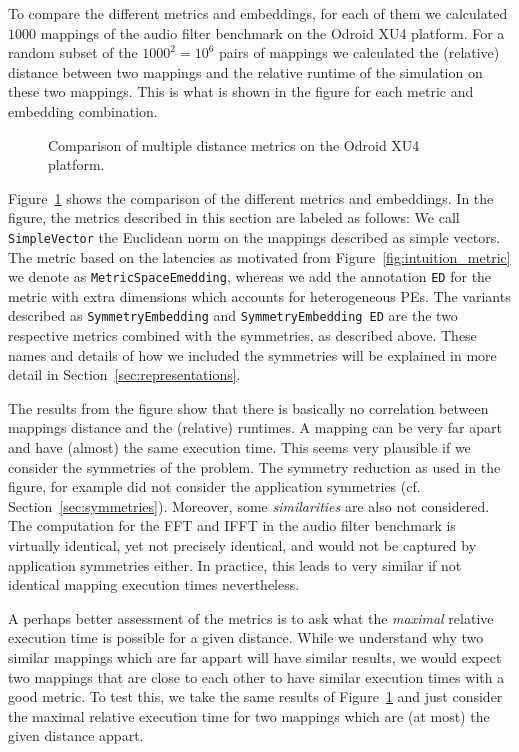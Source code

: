 To compare the different metrics and embeddings, for each of them we calculated $1000$ mappings of the audio filter benchmark on the Odroid XU4 platform. 
For a random subset of the $1000^2 = 10^6$ pairs of mappings we calculated the (relative) distance between two mappings and the relative runtime of the simulation on these two mappings.
This is what is shown in the figure for each metric and embedding combination. 

\begin{figure}[h]
	\centering
	\caption{Comparison of multiple distance metrics on the Odroid XU4 platform.}
	\label{fig:metric_comparison_exynos}
\end{figure}

Figure~\ref{fig:metric_comparison_exynos} shows the comparison of the different metrics and embeddings.
In the figure, the metrics described in this section are labeled as follows: We call \texttt{SimpleVector} the Euclidean norm on the mappings described as simple vectors. 
The metric based on the latencies as motivated from Figure~\ref{fig:intuition_metric} we denote as \texttt{MetricSpaceEmedding}, whereas we add the annotation \texttt{ED} for the metric with extra dimensions which accounts for heterogeneous \acp{PE}.
The variants described as \texttt{SymmetryEmbedding} and \texttt{SymmetryEmbedding ED} are the two respective metrics combined with the symmetries, as described above. 
These names and details of how we included the symmetries will be explained in more detail in Section~\ref{sec:representations}.

The results from the figure show that there is basically no correlation between mappings distance and the (relative) runtimes.
A mapping can be very far apart and have (almost) the same execution time. 
This seems very plausible if we consider the symmetries of the problem.
The symmetry reduction as used in the figure, for example did not consider the application symmetries (cf. Section~\ref{sec:symmetries}).
Moreover, some \emph{similarities} are also not considered.
The computation for the \ac{FFT} and \ac{IFFT} in the audio filter benchmark is virtually identical, yet not precisely identical, and would not be captured by application symmetries either.
In practice, this leads to very similar if not identical mapping execution times nevertheless.

A perhaps better assessment of the metrics is to ask what the \emph{maximal} relative execution time is possible for a given distance.
While we understand why two similar mappings which are far appart will have similar results, we would expect two mappings that are close to each other to have similar execution times with a good metric.
To test this, we take the same results of Figure~\ref{fig:metric_comparison_exynos} and just consider the maximal relative execution time for two mappings which are (at most) the given distance appart.

